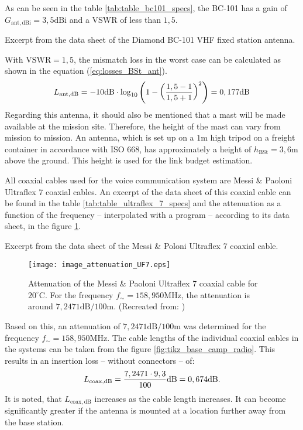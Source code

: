 As can be seen in the table \ref{tab:table_bc101_specs}, the BC-101 has a gain of $G_\mathrm{ant,dBi} = 3,5\mathrm{dBi}$ and a VSWR of less than $1,5$.
\begin{table}[h!]
	\centering
	
	\caption{Excerpt from the data sheet of the Diamond BC-101 VHF fixed station antenna.\cite{antenna:2020}}
	\label{tab:table_bc101_specs}
\end{table}
With $\mathrm{VSWR} = 1,5$, the mismatch loss in the worst case can be calculated as shown in the equation (\ref{eq:losses_BSt_ant}).
\begin{equation} \label{eq:losses_BSt_ant}
	\centering
	L_\mathrm{ant,dB} = - 10\mathrm{dB} \cdot \log_{10} \left(1 - \left(\dfrac{1,5 - 1}{1,5 + 1}\right)^2\right) = 0,177\mathrm{dB}
\end{equation}
Regarding this antenna, it should also be mentioned that a mast will be made available at the mission site. Therefore, the height of the mast can vary from mission to mission. An antenna, which is set up on a $1\mathrm{m}$ high tripod on a freight container in accordance with ISO 668, has approximately a height of $h _\mathrm{BSt} = 3,6\mathrm{m}$ above the ground. This height is used for the link budget estimation. 

All coaxial cables used for the voice communication system are Messi \& Paoloni Ultraflex 7 coaxial cables. An excerpt of the data sheet of this coaxial cable can be found in the table \ref{tab:table_ultraflex_7_specs} and the attenuation as a function of the frequency -- interpolated with a \MATLAB program -- according to its data sheet, in the figure \ref{fig:image_attenuation_UF7}. 
\begin{table}[h!]
	\centering
	
	\caption{Excerpt from the data sheet of the Messi \& Poloni Ultraflex 7 coaxial cable. \cite{Paoloni:2021}}
	\label{tab:table_ultraflex_7_specs}
\end{table}
\begin{figure}[h!]
	\centering
  	\texttt{[image: image\_attenuation\_UF7.eps]}
  	\caption{Attenuation of the Messi \& Paoloni Ultraflex 7 coaxial cable for $20^\circ \mathrm{C}$. For the frequency $f_\sim = 158,950\mathrm{MHz}$, the attenuation is around $7,2471\mathrm{dB/100m}$. (Recreated from: \cite{Paoloni:2021})}
	\label{fig:image_attenuation_UF7}
\end{figure}
Based on this, an attenuation of $7,2471\mathrm{dB/100m}$ was determined for the frequency $f_\sim = 158,950\mathrm{MHz}$. The cable lengths of the individual coaxial cables in the systems can be taken from the figure \ref{fig:tikz_base_camp_radio}. This results in an insertion loss -- without connectors -- of:
\begin{equation} \label{eq:losses_BSt_coax}
	\centering
	L_\mathrm{coax,dB} = \dfrac{7,2471 \cdot 9,3}{100}\mathrm{dB} = 0,674\mathrm{dB}\text{.}
\end{equation}
It is noted, that $L_\mathrm{coax,dB}$ increases as the cable length increases. It can become significantly greater if the antenna is mounted at a location further away from the base station. 

